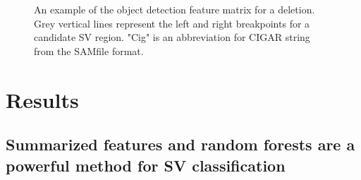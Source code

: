 \begin{figure}
    \centering
    \caption[Sample representations of the object detection feature matrix.]{An example of the object detection feature matrix for a deletion. Grey vertical lines represent the left and right breakpoints for a candidate SV region. "Cig" is an abbreviation for CIGAR string from the SAMfile format.}
    \label{fig:example_pileup}
\end{figure}

\section{Results}

\subsection{Summarized features and random forests are a powerful method for SV classification}

